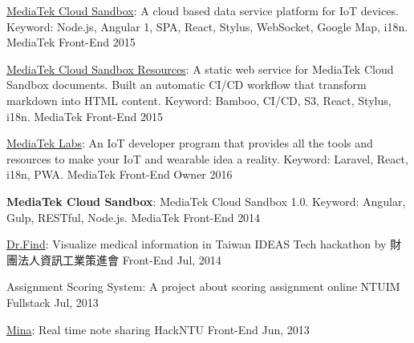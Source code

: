 \begin{cvhonors}
  \cvhonor
    {\href{https://mcs.mediatek.com/}{MediaTek Cloud Sandbox}: \textmd{A cloud based data service platform for IoT devices. Keyword: Node.js, Angular 1, SPA, React, Stylus, WebSocket, Google Map, i18n.}} %
    {MediaTek} %
    {Front-End} %
    {2015} %

  \cvhonor
    {\href{https://mcs.mediatek.com/resources/latest/introduction}{MediaTek Cloud Sandbox Resources}: \textmd{A static web service for MediaTek Cloud Sandbox documents. Built an automatic CI/CD workflow that transform markdown into HTML content. Keyword: Bamboo, CI/CD, S3, React, Stylus, i18n.}} %
    {MediaTek} %
    {Front-End} %
    {2015} %

  \cvhonor
    {\href{https://labs.mediatek.com/}{MediaTek Labs}: \textmd{An IoT developer program that provides all the tools and resources to make your IoT and wearable idea a reality. Keyword: Laravel, React, i18n, PWA.}} %
    {MediaTek} %
    {Front-End Owner} %
    {2016} %

  \cvhonor
    {\textbf{MediaTek Cloud Sandbox}: \textmd{MediaTek Cloud Sandbox 1.0. Keyword: Angular, Gulp, RESTful, Node.js.}} %
    {MediaTek} %
    {Front-End} %
    {2014} %

  \cvhonor
    {\href{https://kdchang.cc/Dr.Find}{Dr.Find}: \textmd{Visualize medical information in Taiwan}} %
    {IDEAS Tech hackathon by 財團法人資訊工業策進會} %
    {Front-End} %
    {Jul, 2014} %

  \cvhonor
    {Assignment Scoring System: \textmd{A project about scoring assignment online}} %
    {NTUIM} %
    {Fullstack} %
    {Jul, 2013} %

  \cvhonor
    {\href{http://minna.herokuapp.com}{Mina}: \textmd{Real time note sharing}} %
    {HackNTU} %
    {Front-End} %
    {Jun, 2013} %


\end{cvhonors}
